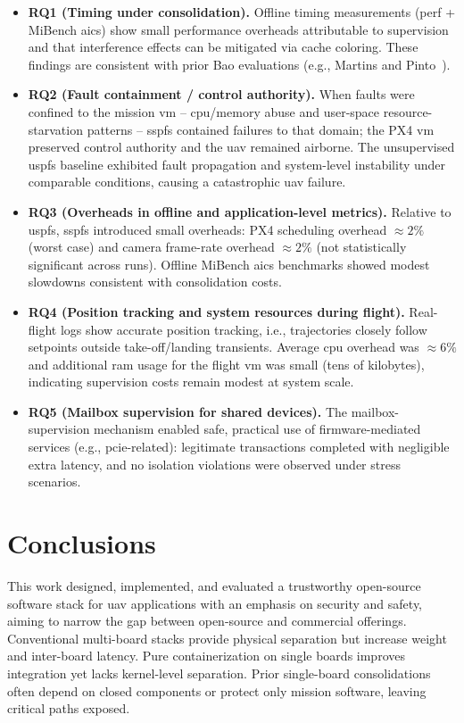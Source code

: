 \begin{itemize}
\item
\textbf{RQ1 (Timing under consolidation).}
Offline timing measurements (perf + MiBench \gls{aics}) show small performance
overheads attributable to supervision and that interference effects can be mitigated via
cache coloring. These findings are consistent with prior Bao evaluations
(e.g., Martins and Pinto~\cite{martins2023shedding}).

\item
\textbf{RQ2 (Fault containment / control authority).}
When faults were confined to the mission \gls{vm} -- \gls{cpu}/memory abuse and
user-space resource-starvation patterns -- \gls{sspfs} contained failures to
that domain; the PX4 \gls{vm} preserved control authority and the \gls{uav}
remained airborne. The unsupervised \gls{uspfs} baseline exhibited fault
propagation and system-level instability under comparable conditions, causing a
catastrophic \gls{uav} failure.

\item
\textbf{RQ3 (Overheads in offline and application-level metrics).}
Relative to \gls{uspfs}, \gls{sspfs} introduced small overheads: PX4 scheduling
overhead \(\approx 2\%\) (worst case) and camera frame-rate overhead \(\approx
2\%\) (not statistically significant across runs). Offline MiBench \gls{aics}
benchmarks showed modest slowdowns consistent with consolidation costs.

\item
\textbf{RQ4 (Position tracking and system resources during flight).}
Real-flight logs show accurate position tracking, i.e., trajectories closely
follow setpoints outside take-off/landing transients. Average \gls{cpu} overhead was
\(\approx 6\%\) and additional \gls{ram} usage for the flight \gls{vm} was small
(tens of kilobytes), indicating supervision costs remain modest at system scale.

\item
\textbf{RQ5 (Mailbox supervision for shared devices).}
The mailbox-supervision mechanism enabled safe, practical use of firmware-mediated services (e.g., \gls{pcie}-related): legitimate transactions completed with negligible extra latency, and no isolation violations were observed under stress scenarios.
\end{itemize}

\section{Conclusions}
This work designed, implemented, and evaluated a trustworthy open-source
software stack for \gls{uav} applications with an emphasis on security and
safety, aiming to narrow the gap between open-source and commercial offerings.
%
Conventional multi-board stacks provide physical separation but increase weight
and inter-board latency. Pure containerization on single boards improves
integration yet lacks kernel-level separation. Prior single-board consolidations
often depend on closed components or protect only mission software, leaving
critical paths exposed.

